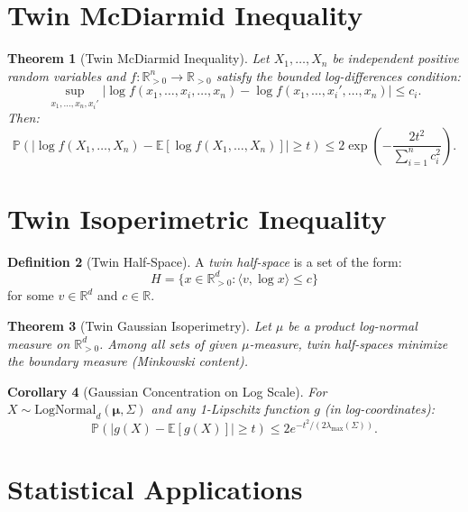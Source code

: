 \documentclass[11pt,twoside,openright]{book}
\theoremstyle{plain}
\newtheorem{theorem}{Theorem}[chapter]
\newtheorem{corollary}[theorem]{Corollary}
\theoremstyle{definition}
\newtheorem{definition}[theorem]{Definition}
\theoremstyle{remark}
\newcommand{\Rd}{\mathbb{R}}
\newcommand{\abs}[1]{|#1|}
\newcommand{\inner}[2]{\langle #1, #2 \rangle}
\newcommand{\E}{\mathbb{E}}
\newcommand{\Prob}{\mathbb{P}}
\begin{document}
\section{Twin McDiarmid Inequality}

\begin{theorem}[Twin McDiarmid Inequality]
\label{thm:twin-mcdiarmid}
Let $X_1, \ldots, X_n$ be independent positive random variables and $f : \Rd_{>0}^n \to \Rd_{>0}$ satisfy the bounded log-differences condition:
\[
\sup_{x_1, \ldots, x_n, x_i'} \abs{\log f(x_1, \ldots, x_i, \ldots, x_n) - \log f(x_1, \ldots, x_i', \ldots, x_n)} \leq c_i.
\]
Then:
\begin{equation}
\Prob\left(\abs{\log f(X_1, \ldots, X_n) - \E[\log f(X_1, \ldots, X_n)]} \geq t\right) \leq 2\exp\left(-\frac{2t^2}{\sum_{i=1}^n c_i^2}\right).
\label{eq:twin-mcdiarmid}
\end{equation}
\end{theorem}

\section{Twin Isoperimetric Inequality}

\begin{definition}[Twin Half-Space]
A \emph{twin half-space} is a set of the form:
\[
H = \{x \in \Rd_{>0}^d : \inner{v}{\log x} \leq c\}
\]
for some $v \in \Rd^d$ and $c \in \Rd$.
\end{definition}

\begin{theorem}[Twin Gaussian Isoperimetry]
\label{thm:twin-isoperimetry}
Let $\mu$ be a product log-normal measure on $\Rd_{>0}^d$. Among all sets of given $\mu$-measure, twin half-spaces minimize the boundary measure (Minkowski content).
\end{theorem}

\begin{corollary}[Gaussian Concentration on Log Scale]
For $X \sim \text{LogNormal}_d(\boldsymbol{\mu}, \Sigma)$ and any 1-Lipschitz function $g$ (in log-coordinates):
\begin{equation}
\Prob(|g(X) - \E[g(X)]| \geq t) \leq 2e^{-t^2/(2\lambda_{\max}(\Sigma))}.
\label{eq:twin-gaussian-concentration}
\end{equation}
\end{corollary}

\section{Statistical Applications}
\end{document}
